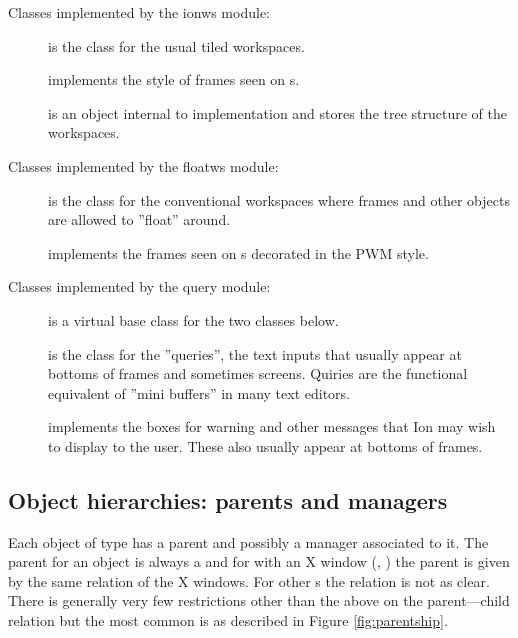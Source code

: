 Classes implemented by the ionws module:

\begin{description}
  \item[] is the class for the
    usual tiled workspaces.
  \item[] implements the
    style of frames seen on s.
  \item[] is an object internal to
     implementation and stores the tree structure of the
    workspaces.
\end{description}


Classes implemented by the floatws module:

\begin{description}
  \item[] is the class for the
    conventional workspaces where frames and other objects are
    allowed to ''float'' around.
  \item[] implements the
    frames seen on s decorated in the PWM style.
\end{description}


Classes implemented by the query module:

\begin{description}
  \item[] is a virtual base class for the
    two classes below.
  \item[] is the class for the ''queries'',
    the text inputs that usually appear at bottoms of frames and sometimes
    screens. Quiries are the functional equivalent of ''mini buffers'' in
    many text editors.
  \item[] implements the boxes for 
    warning and other messages that Ion may wish to display to the user. 
    These also usually appear at bottoms of frames.
\end{description}


\subsection{Object hierarchies:  parents and managers}

Each object of type  has a parent and possibly a manager
associated to it. The parent for an object is always a 
 and for  with an X window (,
) the parent  is given by the same relation of
the X windows. For other s the relation is not as clear.
There is generally very few restrictions other than the above on the
parent---child relation but the most common is as described in
Figure \ref{fig:parentship}.

